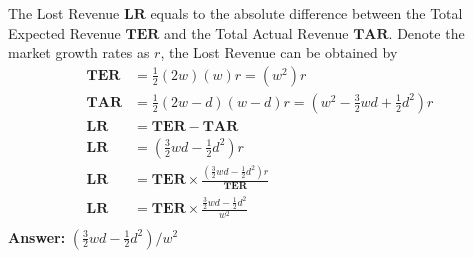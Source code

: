 The Lost Revenue $\textbf{LR}$ equals to the absolute difference between the Total Expected Revenue $\textbf{TER}$ and the Total Actual Revenue $\textbf{TAR}$. Denote the market growth rates as $r$, the Lost Revenue can be obtained by
\begin{align*}
\textbf{TER} &= \frac{1}{2} (2w) (w)r = (w^2) r \\
\textbf{TAR} &= \frac{1}{2} (2w - d) (w-d)r = (w^2 - \frac{3}{2}wd + \frac{1}{2}d^2) r \\
\textbf{LR}  &= \textbf{TER} - \textbf{TAR} \\
\textbf{LR}  &= (\frac{3}{2}wd - \frac{1}{2}d^2) r \\
\textbf{LR}  &= \textbf{TER} \times \frac{(\frac{3}{2}wd - \frac{1}{2}d^2) r}{\textbf{TER}} \\
\textbf{LR}  &= \textbf{TER} \times \frac{\frac{3}{2}wd - \frac{1}{2}d^2}{w^2} \\
\end{align*}
\textbf{Answer:} $(\frac{3}{2}wd - \frac{1}{2}d^2) / w^2$
